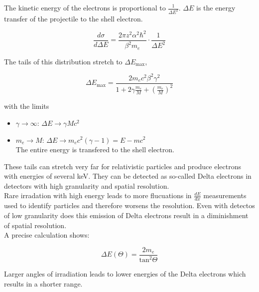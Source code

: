 The kinetic energy of the electrons is proportional to $\frac{1}{\Delta E^2}$. $\Delta E$ is the
energy transfer of the projectile to the shell electron.

\[\frac{d\sigma}{d\Delta E} = \frac{2\pi z^2 \alpha^2 \hbar^2}{\beta^2 m_e}\cdot \frac{1}{\Delta
E^2}
\]

The tails of this distribution stretch to $\Delta E_\text{max}$,

\[\Delta E_\text{max} = \frac{2m_e c^2 \beta^2 \gamma^2}{1+ 2\gamma
\frac{m_e}{M}+\left( \frac{m_e}{M} \right)^2}\]

with the limits

\begin{itemize}
  \item $\gamma\rightarrow\infty$: $\Delta E \rightarrow \gamma Mc^2$
  \item $m_e \rightarrow M$: $\Delta E \rightarrow m_e c^2 (\gamma -1) = E- m c^2$ \\
  		The entire energy is transfered to the shell electron.
\end{itemize}

These tails can stretch very far for relativistic particles and produce electrons with energies of
several keV. They can be detected as so-called Delta electrons in detectors with high granularity
and spatial resolution.
\\
Rare irradation with high energy leads to more flucuations in $\frac{dE}{dx}$ measurements used to
identify particles and therefore worsens the resolution. Even with detectos of low granularity
does this emission of Delta electrons result in a diminishment of spatial resolution. 
\\
A precise calculation shows:

\[\Delta E (\Theta) = \frac{2m_e}{\text{tan}^2\Theta} \]

Larger angles of irradiation leads to lower energies of the Delta electrons which results in a
shorter range.
